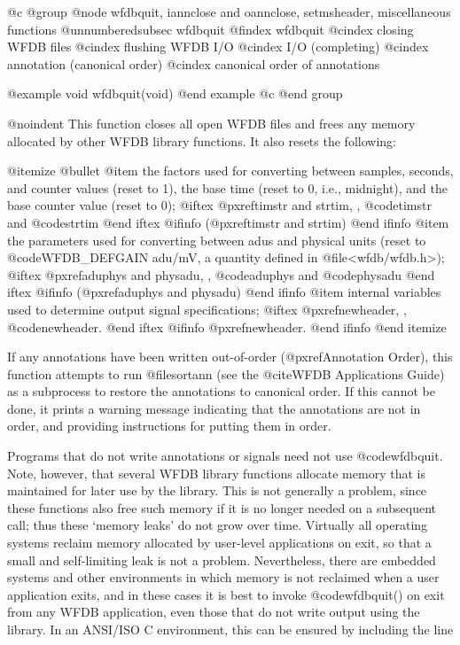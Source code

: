 {{{{{{{{{@c @group
@node     wfdbquit, iannclose and oannclose, setmsheader, miscellaneous functions
@unnumberedsubsec wfdbquit
@findex wfdbquit
@cindex closing WFDB files
@cindex flushing WFDB I/O
@cindex I/O (completing)
@cindex annotation (canonical order)
@cindex canonical order of annotations

@example
void wfdbquit(void)
@end example
@c @end group

@noindent
This function closes all open WFDB files and frees any memory allocated by
other WFDB library functions.  It also resets the following:

@itemize @bullet
@item
the factors used for converting between samples, seconds, and counter
values (reset to 1), the base time (reset to 0, i.e., midnight), and the
base counter value (reset to 0);
@iftex
@pxref{timstr and strtim, , @code{timstr} and @code{strtim}}
@end iftex
@ifinfo
(@pxref{timstr and strtim})
@end ifinfo
@item
the parameters used for converting between adus and physical units (reset to
@code{WFDB_DEFGAIN} adu/mV, a quantity defined in @file{<wfdb/wfdb.h>});
@iftex
@pxref{aduphys and physadu, , @code{aduphys} and @code{physadu}}
@end iftex
@ifinfo
(@pxref{aduphys and physadu})
@end ifinfo
@item
internal variables used to determine output signal specifications;
@iftex
@pxref{newheader, , @code{newheader}}.
@end iftex
@ifinfo
@pxref{newheader}.
@end ifinfo
@end itemize

If any annotations have been written out-of-order (@pxref{Annotation Order}),
this function attempts to run @file{sortann} (see the @cite{WFDB
Applications Guide}) as a subprocess to restore the annotations to canonical
order.  If this cannot be done, it prints a warning message indicating that the
annotations are not in order, and providing instructions for putting them in
order.

Programs that do not write annotations or signals need not use
@code{wfdbquit}.  Note, however, that several WFDB library functions allocate
memory that is maintained for later use by the library.  This is not generally
a problem, since these functions also free such memory if it is no longer
needed on a subsequent call;  thus these `memory leaks' do not grow over time.
Virtually all operating systems reclaim memory allocated by user-level
applications on exit, so that a small and self-limiting leak is not
a problem.  Nevertheless, there are embedded systems and other
environments in which memory is not reclaimed when a user application
exits, and in these cases it is best to invoke @code{wfdbquit()} on exit from
any WFDB application, even those that do not write output using the
library.  In an ANSI/ISO C environment, this can be ensured by
including the line

}}}}}}}}}
